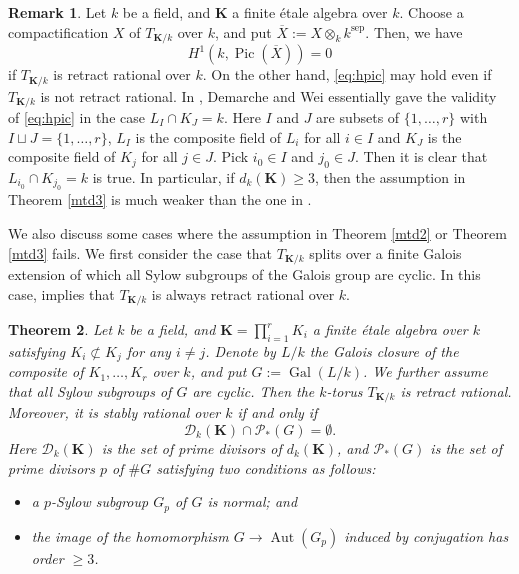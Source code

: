 \documentclass[12pt]{amsart}
\theoremstyle{plain}
\newtheorem{thm}{Theorem}[section]
\theoremstyle{definition}
\newtheorem{rem}[thm]{Remark}
\numberwithin{thm}{section}
\numberwithin{equation}{section}
\newcommand{\bK}{\mathbf{K}}
\DeclareMathOperator{\Aut}{Aut}
\DeclareMathOperator{\Gal}{Gal}
\DeclareMathOperator{\Pic}{Pic}
\DeclareMathOperator{\sep}{sep}
\begin{document}
\begin{rem}
Let $k$ be a field, and $\bK$ a finite {\'e}tale algebra over $k$. Choose a compactification $X$ of $T_{\bK/k}$ over $k$, and put $\overline{X}:=X\otimes_{k}k^{\sep}$. Then, we have 
\begin{equation}\label{eq:hpic}
H^{1}(k,\Pic(\overline{X}))=0
\end{equation}
if $T_{\bK/k}$ is retract rational over $k$. On the other hand, \eqref{eq:hpic} may hold even if $T_{\bK/k}$ is not retract rational. In \cite[Theorem 1]{Demarche2014}, Demarche and Wei essentially gave the validity of \eqref{eq:hpic} in the case $L_{I}\cap K_{J}=k$. Here $I$ and $J$ are subsets of $\{1,\ldots,r\}$ with $I\sqcup J=\{1,\ldots,r\}$, $L_{I}$ is the composite field of $L_{i}$ for all $i\in I$ and $K_{J}$ is the composite field of $K_{j}$ for all $j\in J$. Pick $i_{0}\in I$ and $j_{0}\in J$. Then it is clear that $L_{i_{0}}\cap K_{j_{0}}=k$ is true. In particular, if $d_{k}(\bK)\geq 3$, then the assumption in Theorem \ref{mtd3} is much weaker than the one in \cite[Theorem 1]{Demarche2014}. 
\end{rem}

We also discuss some cases where the assumption in Theorem \ref{mtd2} or Theorem \ref{mtd3} fails. We first consider the case that $T_{\bK/k}$ splits over a finite Galois extension of which all Sylow subgroups of the Galois group are cyclic. In this case, \cite[Theorem 1.5]{Endo1975} implies that $T_{\bK/k}$ is always retract rational over $k$. 

\begin{thm}\label{mth1}
Let $k$ be a field, and $\bK=\prod_{i=1}^{r}K_{i}$ a finite {\'e}tale algebra over $k$ satisfying $K_{i}\not\subset K_{j}$ for any $i \neq j$. Denote by $L/k$ the Galois closure of the composite of $K_{1},\ldots,K_{r}$ over $k$, and put $G:=\Gal(L/k)$. We further assume that all Sylow subgroups of $G$ are cyclic. Then the $k$-torus $T_{\bK/k}$ is retract rational. Moreover, it is stably rational over $k$ if and only if 
\begin{equation*}
\mathscr{D}_{k}(\bK)\cap \mathscr{P}_{*}(G)=\emptyset. 
\end{equation*}
Here $\mathscr{D}_{k}(\bK)$ is the set of prime divisors of $d_{k}(\bK)$, and $\mathscr{P}_{*}(G)$ is the set of prime divisors $p$ of $\#G$ satisfying two conditions as follows: 
\begin{itemize}
\item a $p$-Sylow subgroup $G_{p}$ of $G$ is normal; and
\item the image of the homomorphism $G\rightarrow \Aut(G_{p})$ induced by conjugation has order $\geq 3$. 
\end{itemize}
\end{thm}
\end{document}
